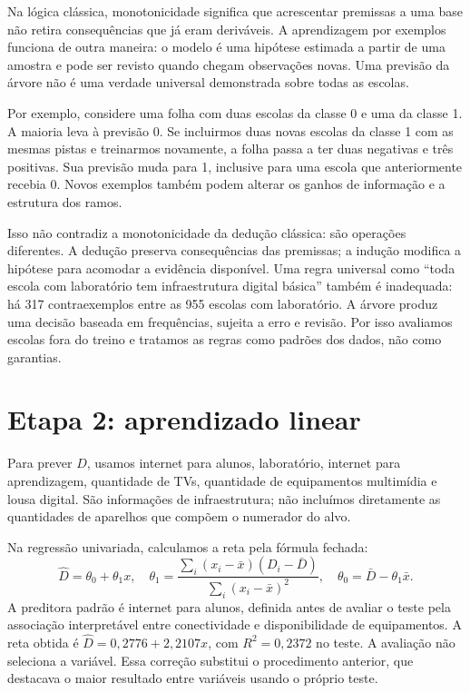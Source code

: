 \documentclass[10pt,a4paper]{article}
\begin{document}
Na lógica clássica, monotonicidade significa que acrescentar premissas a uma base não retira consequências que já eram deriváveis. A aprendizagem por exemplos funciona de outra maneira: o modelo é uma hipótese estimada a partir de uma amostra e pode ser revisto quando chegam observações novas. Uma previsão da árvore não é uma verdade universal demonstrada sobre todas as escolas.

Por exemplo, considere uma folha com duas escolas da classe 0 e uma da classe 1. A maioria leva à previsão 0. Se incluirmos duas novas escolas da classe 1 com as mesmas pistas e treinarmos novamente, a folha passa a ter duas negativas e três positivas. Sua previsão muda para 1, inclusive para uma escola que anteriormente recebia 0. Novos exemplos também podem alterar os ganhos de informação e a estrutura dos ramos.

Isso não contradiz a monotonicidade da dedução clássica: são operações diferentes. A dedução preserva consequências das premissas; a indução modifica a hipótese para acomodar a evidência disponível. Uma regra universal como ``toda escola com laboratório tem infraestrutura digital básica'' também é inadequada: há 317 contraexemplos entre as 955 escolas com laboratório. A árvore produz uma decisão baseada em frequências, sujeita a erro e revisão. Por isso avaliamos escolas fora do treino e tratamos as regras como padrões dos dados, não como garantias.

\newpage
\section{Etapa 2: aprendizado linear}
Para prever $D$, usamos internet para alunos, laboratório, internet para aprendizagem, quantidade de TVs, quantidade de equipamentos multimídia e lousa digital. São informações de infraestrutura; não incluímos diretamente as quantidades de aparelhos que compõem o numerador do alvo.

Na regressão univariada, calculamos a reta pela fórmula fechada:
\[
\hat D=\theta_0+\theta_1x,\quad
\theta_1=\frac{\sum_i(x_i-\bar x)(D_i-\bar D)}{\sum_i(x_i-\bar x)^2},\quad
\theta_0=\bar D-\theta_1\bar x.
\]
A preditora padrão é internet para alunos, definida antes de avaliar o teste pela associação interpretável entre conectividade e disponibilidade de equipamentos. A reta obtida é $\hat D=0,2776+2,2107x$, com $R^2=0,2372$ no teste. A avaliação não seleciona a variável. Essa correção substitui o procedimento anterior, que destacava o maior resultado entre variáveis usando o próprio teste.
\end{document}
